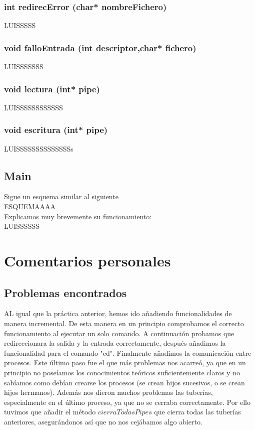 \subsection{int redirecError (char* nombreFichero)}
LUISSSSS
\subsection{void falloEntrada (int descriptor,char* fichero)}
LUISSSSSSS
\subsection{void lectura (int* pipe)}
LUISSSSSSSSSSSS
\subsection{void escritura (int* pipe)}
LUISSSSSSSSSSSSSSs

\section{Main}
Sigue un esquema similar al siguiente
\\
ESQUEMAAAA\\
Explicamos muy brevemente su funcionamiento: \\
LUISSSSSS

\chapter{Comentarios personales}
\section{Problemas encontrados}
AL igual que la práctica anterior, hemos ido añadiendo funcionalidades de manera incremental. De esta manera en un principio comprobamos el correcto funcionamiento al ejecutar un solo comando. A continuación probamos que redireccionara la salida y la entrada correctamente, después añadimos la funcionalidad para el comando "cd". Finalmente añadimos la comunicación entre procesos. Este último paso fue el que más problemas nos acarreó, ya que en un principio no poseíamos los conocimientos teóricos suficientemente claros y no sabíamos como debían crearse los procesos (se crean hijos sucesivos, o se crean hijos hermanos). Además nos dieron muchos problemas las tuberías, especialmente en el último proceso, ya que no se cerraba correctamente. Por ello tuvimos que añadir el método $cierraTodasPipes$ que cierra todas las tuberías anteriores, asegurándonos así que no nos cejábamos algo abierto.
